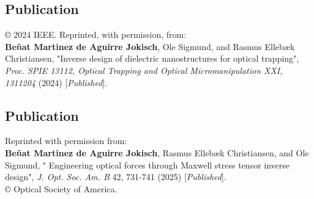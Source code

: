 \vspace*{0.4\textheight}
\begin{center}
  \begin{minipage}{0.9\linewidth}
    \section*{Publication \cite{ownpub3}}

    © 2024 IEEE. Reprinted, with permission, from: \\


    \textbf{Beñat Martinez de Aguirre Jokisch}, Ole Sigmund, and Rasmus Ellebæk Christiansen, "Inverse design of dielectric nanostructures for optical trapping", \textit{Proc. SPIE 13112, Optical Trapping and Optical Micromanipulation XXI, 1311204} (2024) [\textit{Published}].
  \end{minipage}
\end{center}
\newpage


\vspace*{0.4\textheight}
\begin{center}
  \begin{minipage}{0.9\linewidth}
    \section*{Publication \cite{ownpub2}}
    Reprinted with permission from:\\ 

    \textbf{Beñat Martinez de Aguirre Jokisch}, Rasmus Ellebæk Christiansen, and Ole Sigmund, "
    Engineering optical forces through Maxwell stress tensor inverse design",  \textit{J. Opt. Soc. Am. B} 42, 731-741 (2025) [\textit{Published}].\\

    © Optical Society of America.

  \end{minipage}
\end{center}
\newpage


